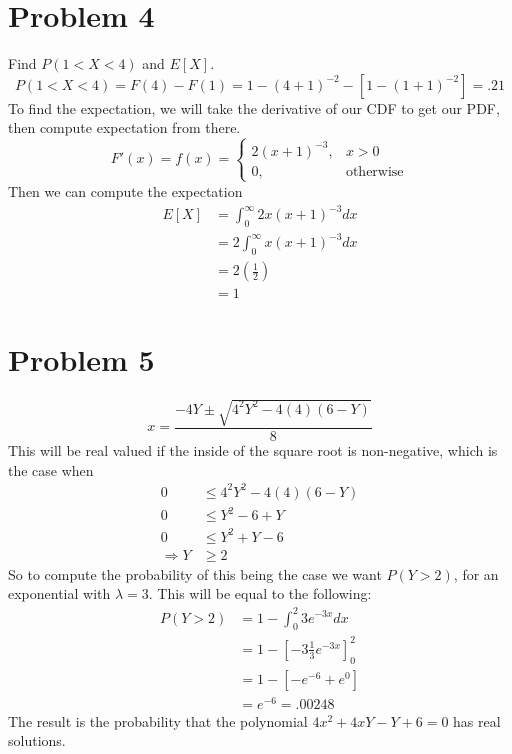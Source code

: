 \documentclass{article}
\begin{document}
\section*{Problem 4}
    Find $P(1 < X < 4)$ and $E[X]$.
    \[
        P(1 < X < 4) = F(4) - F(1) = 1 - (4 + 1)^{-2} - [1 - (1+1)^{-2}] = .21
    \]
    To find the expectation, we will take the derivative of our CDF to get our PDF, then compute expectation from there.
    \[
        F'(x) = f(x) =
        \begin{cases}
            2(x+1)^{-3}, & x > 0\\
            0, & \text{otherwise}
        \end{cases}
    \]
    Then we can compute the expectation
    \begin{align*}
        E[X] &= \int_0^\infty 2x(x+1)^{-3} dx \\
        &= 2 \int_0^\infty x(x+1)^{-3}dx\\
        &= 2 (\frac{1}{2})\\
        &= 1
    \end{align*}

\section*{Problem 5}
    \[
        x = \frac{-4Y \pm \sqrt{4^2 Y^2 - 4(4)(6 - Y)}}{8}
    \]
    This will be real valued if the inside of the square root is non-negative, which
    is the case when
    \begin{align*}
        0 &\leq 4^2 Y^2 - 4(4)(6 - Y)\\
        0 &\leq  Y^2 - 6 + Y \\
        0 &\leq Y^2 + Y - 6\\
        \Longrightarrow Y &\geq 2
    \end{align*}
    So to compute the probability of this being the case we want $P(Y > 2)$, for an exponential with $\lambda = 3$.
    This will be equal to the following: 
    \begin{align*}
        P(Y > 2) &= 1 - \int_0^2 3e^{-3x} dx\\
        &= 1 - \left[-3\frac{1}{3}e^{-3x}\right]_0^2 \\
        &= 1 - \left[-e^{-6} + e^0\right]\\
        &= e^{-6} = .00248
    \end{align*}
    The result is the probability that the polynomial $4x^2 +4xY - Y + 6 = 0$ has real solutions.
\end{document}
